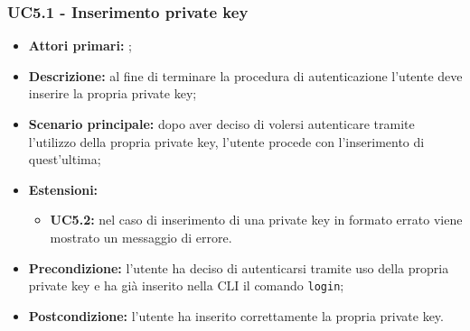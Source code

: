 \subsubsection{UC5.1 - Inserimento private key }
\begin{itemize}
	\item \textbf{Attori primari:} \una{};
	\item \textbf{Descrizione:} al fine di terminare la procedura di autenticazione l’utente deve inserire la propria private key;
	\item \textbf{Scenario principale:} dopo aver deciso di volersi autenticare tramite l’utilizzo della propria private key, l’utente procede con l’inserimento di quest’ultima;  
	\item \textbf{Estensioni:} 
	\begin{itemize}
		\item \textbf{UC5.2:} nel caso di inserimento di una private key in formato errato viene mostrato un messaggio di errore.
	\end{itemize}
	\item \textbf{Precondizione:} l’utente ha deciso di autenticarsi tramite uso della propria private key e ha già inserito nella CLI il comando \texttt{login}; 
	\item \textbf{Postcondizione:} l’utente ha inserito correttamente la propria private key. 
\end{itemize}